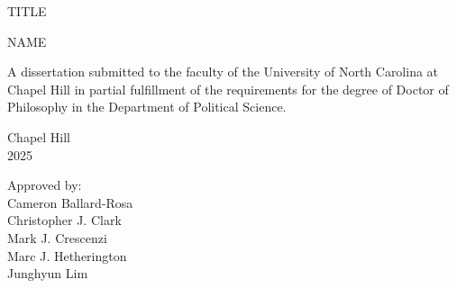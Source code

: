 \begin{titlepage}
\begin{center}


\vspace{60pt}
\begin{singlespace}
TITLE
 \end{singlespace}


\vspace*{64pt} %
NAME
\end{center}



\vspace{40pt}
\begin{singlespace}
\noindent
\begin{center}
A dissertation submitted to the faculty of the University of North Carolina at Chapel Hill
in partial fulfillment of the requirements for the degree of Doctor of Philosophy in
the Department of Political Science.
\end{center}
\end{singlespace}


\vspace{40pt}
\begin{center}
\begin{singlespace}
Chapel Hill\\
2025
\end{singlespace}
\end{center}


\vspace{46pt}
\begin{flushright}
\begin{minipage}{2.0in}
Approved by:\\
Cameron Ballard-Rosa \\
Christopher J. Clark \\
Mark J. Crescenzi \\
Marc J. Hetherington \\
Junghyun Lim
\end{minipage}
\end{flushright}

\end{titlepage}
